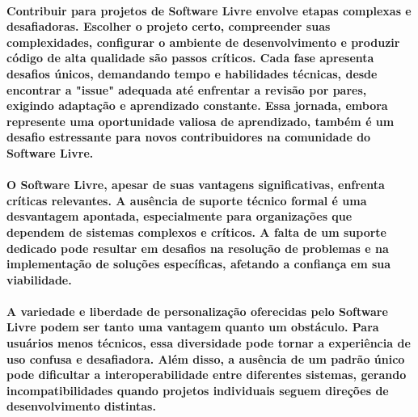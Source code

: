 \documentclass[a4paper, 12pt]{article}
\begin{document}
\paragraph{Contribuir para projetos de Software Livre envolve etapas complexas e desafiadoras. Escolher o projeto certo, compreender suas complexidades, configurar o ambiente de desenvolvimento e produzir código de alta qualidade são passos críticos. Cada fase apresenta desafios únicos, demandando tempo e habilidades técnicas, desde encontrar a "issue" adequada até enfrentar a revisão por pares, exigindo adaptação e aprendizado constante. Essa jornada, embora represente uma oportunidade valiosa de aprendizado, também é um desafio estressante para novos contribuidores na comunidade do Software Livre.}

\paragraph{O Software Livre, apesar de suas vantagens significativas, enfrenta críticas relevantes\cite{dado1}. A ausência de suporte técnico formal é uma desvantagem apontada, especialmente para organizações que dependem de sistemas complexos e críticos. A falta de um suporte dedicado pode resultar em desafios na resolução de problemas e na implementação de soluções específicas, afetando a confiança em sua viabilidade.}
\paragraph{A variedade e liberdade de personalização oferecidas pelo Software Livre podem ser tanto uma vantagem quanto um obstáculo. Para usuários menos técnicos, essa diversidade pode tornar a experiência de uso confusa e desafiadora. Além disso, a ausência de um padrão único pode dificultar a interoperabilidade entre diferentes sistemas, gerando incompatibilidades quando projetos individuais seguem direções de desenvolvimento distintas.}

\end{document}
